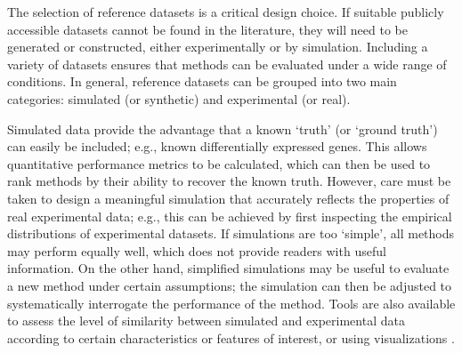 \documentclass[12pt, a4paper]{article}
\begin{document}
The selection of reference datasets is a critical design choice. If suitable publicly accessible datasets cannot be found in the literature, they will need to be generated or constructed, either experimentally or by simulation. Including a variety of datasets ensures that methods can be evaluated under a wide range of conditions. In general, reference datasets can be grouped into two main categories: simulated (or synthetic) and experimental (or real).

Simulated data provide the advantage that a known `truth' (or `ground truth') can easily be included; e.g., known differentially expressed genes. This allows quantitative performance metrics to be calculated, which can then be used to rank methods by their ability to recover the known truth. However, care must be taken to design a meaningful simulation that accurately reflects the properties of real experimental data; e.g., this can be achieved by first inspecting the empirical distributions of experimental datasets. If simulations are too `simple', all methods may perform equally well, which does not provide readers with useful information. On the other hand, simplified simulations may be useful to evaluate a new method under certain assumptions; the simulation can then be adjusted to systematically interrogate the performance of the method. Tools are also available to assess the level of similarity between simulated and experimental data according to certain characteristics or features of interest, or using visualizations \citep{Soneson2017}.
\end{document}
